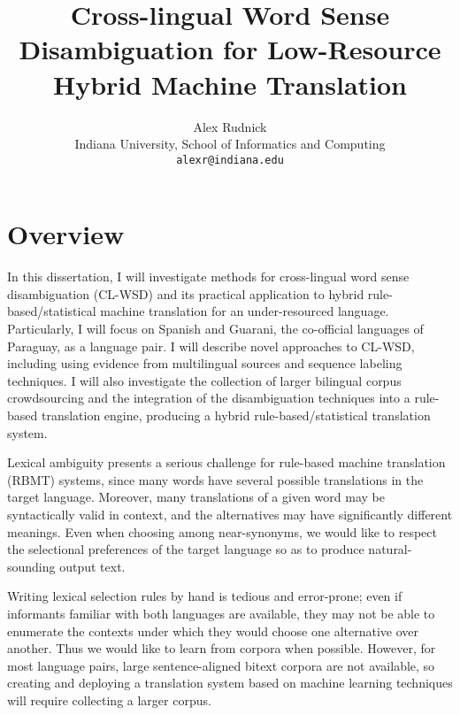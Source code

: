 \documentclass{article}
\title{Cross-lingual Word Sense Disambiguation for Low-Resource Hybrid Machine
Translation}
\author{Alex Rudnick \\
	    Indiana University, School of Informatics and Computing \\
	    {\tt alexr@indiana.edu}}
\date{}
\begin{document}
\maketitle




\section{Overview}
In this dissertation, I will investigate methods for cross-lingual word sense
disambiguation (CL-WSD) and its practical application to hybrid
rule-based/statistical machine translation for an under-resourced language.
Particularly, I will focus on Spanish and Guarani, the co-official languages of
Paraguay, as a language pair. 
I will describe novel approaches to CL-WSD, including using evidence from
multilingual sources and sequence labeling techniques. I will also investigate
the collection of larger bilingual corpus crowdsourcing and the integration of
the disambiguation techniques into a rule-based translation engine, producing a
hybrid rule-based/statistical translation system.

Lexical ambiguity presents a serious challenge for rule-based machine
translation (RBMT) systems, since many words have several possible translations
in the target language. Moreover, many translations of a given word may
be syntactically valid in context, and the alternatives may have significantly
different meanings. Even when choosing among near-synonyms, we would like to
respect the selectional preferences of the target language so as to produce
natural-sounding output text.

Writing lexical selection rules by hand is tedious and error-prone; even if
informants familiar with both languages are available, they may not be able to
enumerate the contexts under which they would choose one alternative over
another. Thus we would like to learn from corpora when possible. However, for
most language pairs, large sentence-aligned bitext corpora are not available,
so creating and deploying a translation system based on machine learning 
techniques will require collecting a larger corpus.
\end{document}
